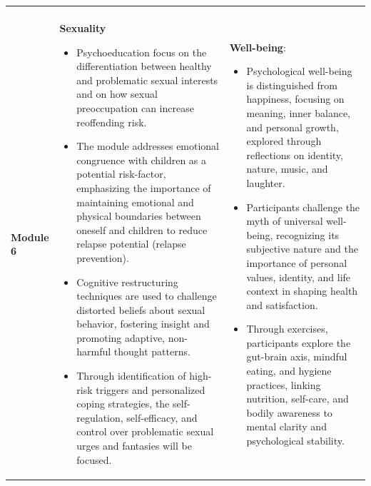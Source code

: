 \documentclass[
  super,
  preprint,
  1p,
  onecolumn]{elsarticle}
\begin{document}
\begin{table}
{\begin{tabular*}{\linewidth}{@{\extracolsep{\fill}}lll}
\begin{itemize}
\end{itemize} \\ 
\textbf{Module 6} & \textbf{Sexuality}

\begin{itemize}
\item Psychoeducation focus on the differentiation between healthy and problematic sexual interests and on how sexual preoccupation can increase reoffending risk.

\item The module addresses emotional congruence with children as a potential risk-factor, emphasizing the importance of maintaining emotional and physical boundaries between oneself and children to reduce relapse potential (relapse prevention).

\item Cognitive restructuring techniques are used to challenge distorted beliefs about sexual behavior, fostering insight and promoting adaptive, non-harmful thought patterns.

\item Through identification of high-risk triggers and personalized coping strategies, the self-regulation, self-efficacy, and control over problematic sexual urges and fantasies will be focused.

\end{itemize} & \textbf{Well-being}:

\begin{itemize}
\item Psychological well-being is distinguished from happiness, focusing on meaning, inner balance, and personal growth, explored through reflections on identity, nature, music, and laughter.

\item Participants challenge the myth of universal well-being, recognizing its subjective nature and the importance of personal values, identity, and life context in shaping health and satisfaction.

\item Through exercises, participants explore the gut-brain axis, mindful eating, and hygiene practices, linking nutrition, self-care, and bodily awareness to mental clarity and psychological stability.

\end{itemize} \\ 
\bottomrule
\end{tabular*}

}

\end{table}%
\end{document}
